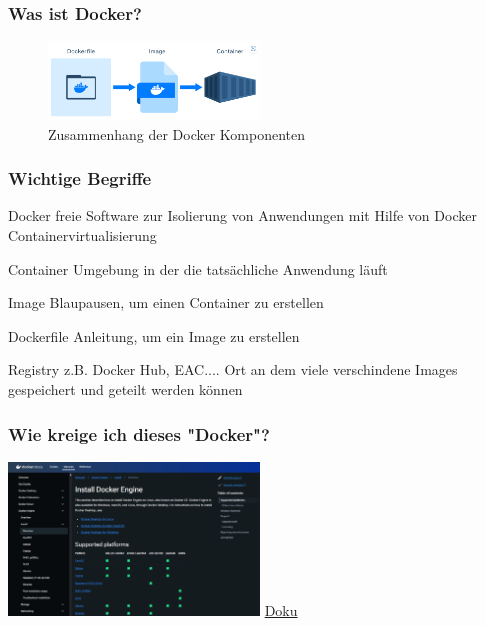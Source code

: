 \documentclass[22pt,handout]{beamer}
\begin{document}
\begin{frame}[t]
    \frametitle{Was ist Docker?}
    \begin{figure}[h]
        \centering
        \includegraphics[width=0.5\textwidth]{Bilder/Docker-Ablauf.png}
        \caption{Zusammenhang der Docker Komponenten}
    \end{figure}
\end{frame}

\begin{frame}[t]
    \frametitle{Wichtige Begriffe}
    \begin{block}{Docker}
        freie Software zur Isolierung von Anwendungen mit Hilfe von     Docker
        Containervirtualisierung
    \end{block}
    \begin{block}{Container}
        Umgebung in der die tatsächliche Anwendung läuft
    \end{block}
    \begin{block}{Image}
        Blaupausen, um einen Container zu erstellen
    \end{block}
    \begin{block}{Dockerfile}
        Anleitung, um ein Image zu erstellen
    \end{block}
    \begin{block}{Registry}
        z.B. Docker Hub, EAC....
        Ort an dem viele verschindene Images gespeichert und geteilt werden können
    \end{block}
\end{frame}

\begin{frame}[t]
    \frametitle{Wie kreige ich dieses "Docker"?}
    \includegraphics[width=0.5\textwidth]{Bilder/Installation.png}
    \href{https://docs.docker.com/engine/install}{Doku}
\end{frame}
\end{document}
